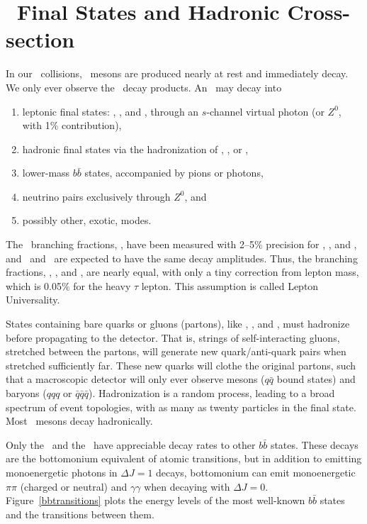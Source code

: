 \documentclass{cornell}
\begin{document}
\section{\boldmath \ups\ Final States and Hadronic Cross-section}

In our \ee\ collisions, \ups\ mesons are produced nearly at rest and
immediately decay.  We only ever observe the \ups\ decay products.  An
\ups\ may decay into
\renewcommand{\labelenumi}{\alph{enumi}.}
\begin{enumerate}

  \item leptonic final states: \ee, \mumu, and \tautau, through an
    $s$-channel virtual photon (or $Z^0$, with 1\% contribution),

  \item hadronic final states via the hadronization of \qqbar, \ggg,
    or \gggamma,

  \item lower-mass $b\bar{b}$ states, accompanied by pions or photons,

  \item neutrino pairs exclusively through $Z^0$, and

  \item possibly other, exotic, modes.

\end{enumerate}

The \mumu\ branching fractions, \bmm, have been measured with 2--5\%
precision for \us, \uss, and \usss, and \ee\ and \tautau\ are expected
to have the same decay amplitudes.  Thus, the branching fractions,
\bee, \bmm, and \btt, are nearly equal, with only a tiny correction
from lepton mass, which is 0.05\% for the heavy $\tau$ lepton.  This
assumption is called Lepton Universality.

States containing bare quarks or gluons (partons), like \qqbar, \ggg,
and \gggamma, must hadronize before propagating to the detector.  That
is, strings of self-interacting gluons, stretched between the partons,
will generate new quark/anti-quark pairs when stretched sufficiently
far.  These new quarks will clothe the original partons, such that a
macroscopic detector will only ever observe mesons ($q\bar{q}$ bound
states) and baryons ($qqq$ or $\bar{q}\bar{q}\bar{q}$).  Hadronization
is a random process, leading to a broad spectrum of event topologies,
with as many as twenty particles in the final state.  Most \ups\
mesons decay hadronically.

Only the \uss\ and the \usss\ have appreciable decay rates to other
$b\bar{b}$ states.  These decays are the bottomonium equivalent of
atomic transitions, but in addition to emitting monoenergetic photons
in $\Delta J = 1$ decays, bottomonium can emit monoenergetic $\pi\pi$
(charged or neutral) and $\gamma\gamma$ when decaying with $\Delta J =
0$.  Figure~\ref{bbtransitions} plots the energy levels of the most
well-known $b\bar{b}$ states and the transitions between them.
\end{document}
